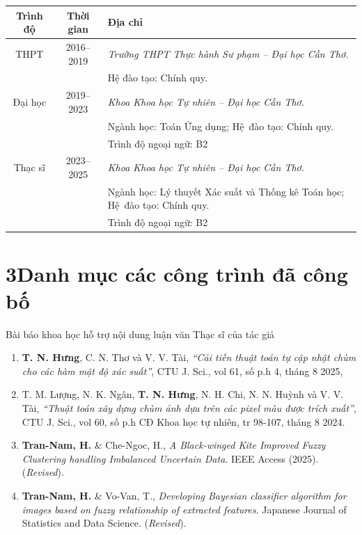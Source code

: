 	\begin{table}[H]
		\centering
		\begin{tabular*}{\columnwidth}{@{\extracolsep\fill}ccp{10cm}@{\extracolsep\fill}} 
		\toprule
	\bf	Trình độ &\bf Thời gian &\bf Địa chỉ \\ \midrule
		THPT
		& 2016–2019
		& \it Trường THPT Thực hành Sư phạm – Đại học Cần Thơ.\\
		& &  Hệ đào tạo: Chính quy.\\ 
		
		Đại học
		& 2019–2023
		& \it Khoa Khoa học Tự nhiên – Đại học Cần Thơ.\\
		& & Ngành học: Toán Ứng dụng; Hệ~đào tạo: Chính quy.\\ 
		&& Trình độ ngoại ngữ: B2\\
		
		Thạc sĩ
		& 2023–2025
		&\it Khoa Khoa học Tự nhiên – Đại học Cần Thơ.\\
		& & Ngành học: Lý thuyết Xác suất và Thống kê Toán học; Hệ~đào tạo: Chính quy.\\
		&& Trình độ ngoại ngữ: B2\\ \bottomrule
\end{tabular*}
\end{table}



\section*{3\qquad Danh mục các công trình đã công bố}

Bài báo khoa học hỗ trợ nội dung luận văn Thạc sĩ của tác giả

\begin{enumerate}[label=(\roman*)]
\item	\textbf{T. N. Hưng}, C. N. Thơ và V. V. Tài, \textit{“Cải tiến thuật toán tự cập nhật chùm cho các hàm mật độ xác suất”}, CTU J. Sci., vol 61, số p.h 4, tháng 8 2025,
\item T. M. Lượng, N. K. Ngân, \textbf{T. N. Hưng}, N. H. Chi, N. N. Huỳnh và V. V. Tài, \textit{“Thuật toán xây dựng chùm ảnh dựa trên các pixel màu được trích xuất”}, CTU J. Sci., vol 60, số p.h CĐ Khoa học tự nhiên, tr 98-107, tháng 8 2024.
	\item \textbf{Tran-Nam, H.} \& Che-Ngoc, H., \textit{A Black-winged Kite Improved Fuzzy Clustering handling Imbalanced Uncertain Data}. IEEE Access (2025). (\textit{Revised}).
	\item \textbf{Tran-Nam, H.} \& Vo-Van, T., \textit{Developing Bayesian classifier algorithm for images based on fuzzy relationship of extracted features}.  Japanese Journal of Statistics and Data Science. (\textit{Revised}).
\end{enumerate}

